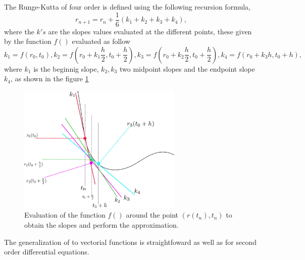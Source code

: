 \documentclass[12pt]{article}
\begin{document}
The Runge-Kutta of four order is defined using the following recursion
formula,
\begin{equation}
  \label{eq:RecursionFormulaeSolution}
  r_{n+1} = r_{n} + \frac{1}{6}(k_{1}+k_{2}+k_{3}+k_{4}),
\end{equation}
where the \(k's\) are the slopes values evaluated at the different
points, these given by the function \(f()\) evaluated as follow
\begin{subequations}
  \begin{equation}
    \label{eq:slope1}
    k_{1}= f(r_{0},t_{0}),
  \end{equation}
  \begin{equation}
    \label{eq:slope2}
    k_{2}= f(r_{0}+k_{1}\frac{h}{2},t_{0}+\frac{h}{2}),
  \end{equation}
  \begin{equation}
    \label{eq:slope3}
    k_{3}= f(r_{0}+k_{2}\frac{h}{2},t_{0}+\frac{h}{2}),
  \end{equation}
    \begin{equation}
    \label{eq:slope4}
    k_{4}= f(r_{0}+k_{3}h, t_{0}+h),
  \end{equation}
\end{subequations}
where \(k_{1}\) is the beginnig slope, \(k_{2},k_{3}\) two midpoint
slopes and the endpoint slope \(k_{4}\), as shown in the figure
\ref{fig:CurveSlopes}
\begin{figure}
  \centering
  \includegraphics[width=0.7\textwidth]{CurveSlopes.png}
  \caption[Slopes]{Evaluation of the function $f()$ around the point $(r(t_{n}),t_{n})$
to obtain the slopes and perform the approximation.}
\label{fig:CurveSlopes}
\end{figure}

The generalization of to vectorial functions is straightfoward as well
as for second order differential equations.
\end{document}
